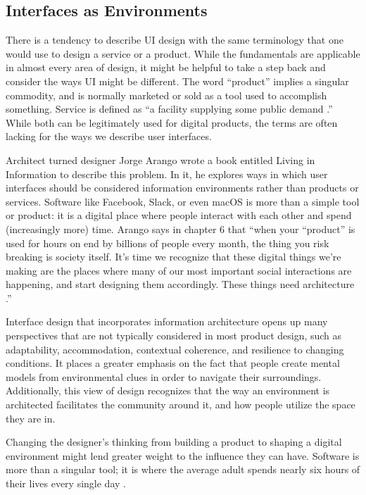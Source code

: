 \documentclass[12pt, oneside]{article}
\begin{document}
\subsection{Interfaces as Environments}

There is a tendency to describe UI design with the same terminology that one would use to design a service or a product. While the fundamentals are applicable in almost every area of design, it might be helpful to take a step back and consider the ways UI might be different. The word ``product'' implies a singular commodity, and is normally marketed or sold as a tool used to accomplish something. Service is defined as ``a facility supplying some public demand \cite{merriam-webster}.'' While both can be legitimately used for digital products, the terms are often lacking for the ways we describe user interfaces.

Architect turned designer Jorge Arango wrote a book entitled Living in Information to describe this problem. In it, he explores ways in which user interfaces should be considered information environments rather than products or services. Software like Facebook, Slack, or even macOS is more than a simple tool or product: it is a digital place where people interact with each other and spend (increasingly more) time. Arango says in chapter 6 that ``when your ``product'' is used for hours on end by billions of people every month, the thing you risk breaking is society itself. It’s time we recognize that these digital things we’re making are the places where many of our most important social interactions are happening, and start designing them accordingly. These things need architecture \cite{arango_2018}.''

Interface design that incorporates information architecture opens up many perspectives that are not typically considered in most product design, such as adaptability, accommodation, contextual coherence, and resilience to changing conditions. It places a greater emphasis on the fact that people create mental models from environmental clues in order to navigate their surroundings. Additionally, this view of design recognizes that the way an environment is architected facilitates the community around it, and how people utilize the space they are in.

Changing the designer's thinking from building a product to shaping a digital environment might lend greater weight to the influence they can have. Software is more than a singular tool; it is where the average adult spends nearly six hours of their lives every single day \cite{marvin_2018}.
\end{document}
